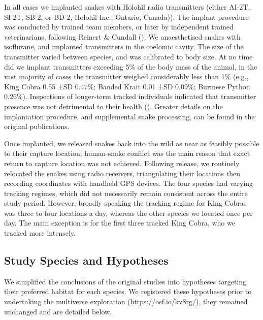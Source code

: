 \documentclass[10pt,a4paper]{article}
\begin{document}
In all cases we implanted snakes with Holohil radio transmitters (either AI-2T, SI-2T, SB-2, or BD-2, Holohil Inc., Ontario, Canada)).
The implant procedure was conducted by trained team members, or later by independent trained veterinarians, following Reinert \& Cundall ().
We anaesthetised snakes with isoflurane, and implanted transmitters in the coelomic cavity.
The size of the transmitter varied between species, and was calibrated to body size.
At no time did we implant transmitters exceeding 5\% of the body mass of the animal, in the vast majority of cases the transmitter weighed considerably less than 1\% (e.g., King Cobra 0.55 ±SD 0.47\%; Banded Krait 0.01 ±SD 0.09\%; Burmese Python 0.26\%).
Inspections of longer-term tracked individuals indicated that transmitter presence was not detrimental to their health ().
Greater details on the implantation procedure, and supplemental snake processing, can be found in the original publications.

Once implanted, we released snakes back into the wild as near as feasibly possible to their capture location; human-snake conflict was the main reason that exact return to capture location was not achieved.
Following release, we routinely relocated the snakes using radio receivers, triangulating their locations then recording coordinates with handheld GPS devices.
The four species had varying tracking regimes, which did not necessarily remain consistent across the entire study period.
However, broadly speaking the tracking regime for King Cobras was three to four locations a day, whereas the other species we located once per day.
The main exception is for the first three tracked King Cobra, who we tracked more intensely.

\subsection{Study Species and Hypotheses}\label{study-species-and-hypotheses}

We simplified the conclusions of the original studies into hypotheses targeting their preferred habitat for each species.
We registered these hypotheses prior to undertaking the multiverse exploration (\url{https://osf.io/kv8rg/}), they remained unchanged and are detailed below.
\end{document}
